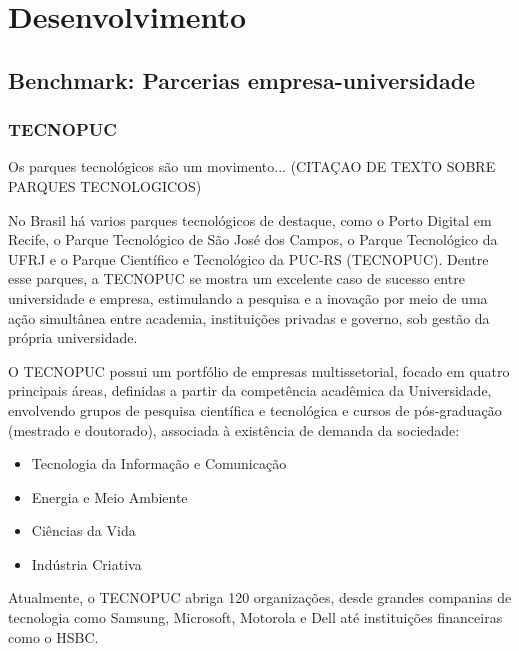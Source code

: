\chapter{Desenvolvimento}
\label{cha:desenvolvimento}

\section{Benchmark: Parcerias empresa-universidade} %
\label{sec:cases}

\subsection{TECNOPUC}

Os parques tecnológicos são um movimento... (CITAÇAO DE TEXTO SOBRE PARQUES TECNOLOGICOS)

No Brasil há varios parques tecnológicos de destaque, como o Porto Digital em Recife, o Parque Tecnológico de São José dos Campos, o Parque Tecnológico da UFRJ e o Parque Científico e Tecnológico da PUC-RS (TECNOPUC). Dentre esse parques, a TECNOPUC se mostra um excelente caso de sucesso entre universidade e empresa, estimulando a pesquisa e a inovação por meio de uma ação simultânea entre academia, instituições privadas e governo, sob gestão da própria universidade.

O TECNOPUC possui um portfólio de empresas multissetorial, focado em quatro principais áreas, definidas a partir da competência acadêmica da Universidade, envolvendo grupos de pesquisa científica e tecnológica e cursos de pós-graduação (mestrado e doutorado), associada à existência de demanda da sociedade:

\begin{itemize}
\item Tecnologia da Informação e Comunicação
\item Energia e Meio Ambiente
\item Ciências da Vida
\item Indústria Criativa
\end{itemize}

Atualmente, o TECNOPUC abriga 120 organizações, desde grandes companias de tecnologia como Samsung, Microsoft, Motorola e Dell até instituições financeiras como o HSBC. 

